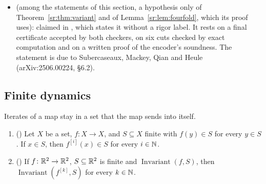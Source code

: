 \begin{remark}
\begin{itemize}
   does not import . Its lines
  38--1084 are byte-identical to lines 12--1058 of , so the classes defined in
   are copies of those of Definition~\ref{sr:def:classes}, with the same
  full names and the same text. Both classes are also supplied by SAT certificates in  (Theorems 2a and 2b
  of , claimed in the records as computer-assisted), and  also,
  conditionally, by the Lean chain of  and  (Remark~\ref{sr:rem:mirror-line}).
\item {} (among the statements of this section, a hypothesis only of Theorem~\ref{sr:thm:variant} and
  of Lemma~\ref{sr:lem:fourfold}, which its proof uses): claimed in , which states it without a
  rigor label. It rests on a final certificate accepted by both checkers, on six cuts checked by exact computation and
  on a written proof of the encoder's soundness. The statement is due to Subercaseaux, Mackey, Qian and Heule
  (arXiv:2506.00224, \S6.2).
\end{itemize}
\end{remark}

\subsection{Finite dynamics}\label{sr:ssec:dyn}

\begin{lemma}\label{sr:lem:iterate}
Iterates of a map stay in a set that the map sends into itself.
\begin{enumerate}[label=(\alph*)]
\item () Let $X$ be a set, $f\colon X\to X$, and $S\subseteq X$ finite with $f(y)\in S$ for every
  $y\in S$. If $x\in S$, then $f^{[i]}(x)\in S$ for every $i\in\mathbb N$.
\item () If $f\colon\mathbb R^2\to\mathbb R^2$, $S\subseteq\mathbb R^2$ is finite and $\operatorname{Invariant}(f,S)$,
  then $\operatorname{Invariant}(f^{[k]},S)$ for every $k\in\mathbb N$.
\end{enumerate}
\end{lemma}


